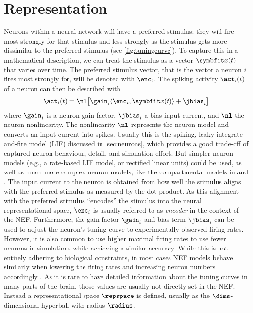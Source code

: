 \section{Representation}
Neurons within a neural network will have a preferred stimulus: they will fire most strongly for that stimulus and less strongly as the stimulus gets more dissimilar to the preferred stimulus (see \cref{fig:tuningcurve}).
To capture this in a mathematical description, we can treat the stimulus as a vector $\vc x(t)$ that varies over time.
The preferred stimulus vector, that is the vector a neuron $i$ fires most strongly for, will be denoted with $\enc_i$.
The spiking activity $\act_i(t)$ of a neuron can then be described with
\begin{equation}
    \act_i(t) = \nl\!\sbr{\gain_i \langle\enc_i, \vc x(t)\rangle + \jbias_i}
\end{equation}
where $\gain_i$ is a neuron gain factor, $\jbias_i$ a bias input current, and $\nl$ the neuron nonlinearity.
The nonlinearity $\nl$ represents the neuron model and converts an input current into spikes.
Usually this is the spiking, leaky integrate-and-fire model (LIF) discussed in \cref{sec:neurons}, which provides a good trade-off of captured neuron behaviour, detail, and simulation effort.
But simpler neuron models (e.g., a rate-based LIF model, or rectified linear units) could be used, as well as much more complex neuron models, like the compartmental models in \textcite{eliasmith2016} and \textcite{duggins2017c}.
The input current to the neuron is obtained from how well the stimulus aligns with the preferred stimulus as measured by the dot product.
As this alignment with the preferred stimulus ``encodes'' the stimulus into the neural representational space, $\enc_i$ is usually referred to as \emph{encoder} in the context of the NEF\@.
Furthermore, the gain factor $\gain_i$ and bias term $\jbias_i$ can be used to adjust the neuron's tuning curve to experimentally observed firing rates.
However, it is also common to use higher maximal firing rates to use fewer neurons in simulations while achieving a similar accuracy.
While this is not entirely adhering to biological constraints, in most cases NEF models behave similarly when lowering the firing rates and increasing neuron numbers accordingly \parencite[e.g.,][]{gosmann2015}.
As it is rare to have detailed information about the tuning curves in many parts of the brain, those values are usually not directly set in the NEF\@.
Instead a representational space $\repspace$ is defined, usually as the $\dims$-dimensional hyperball with radius $\radius$.
